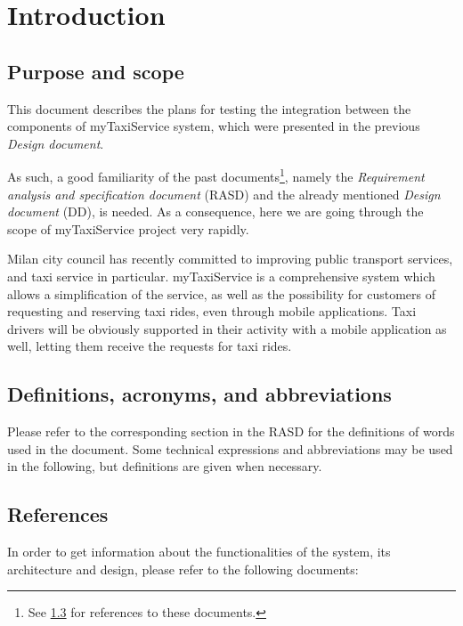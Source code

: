 \chapter{Introduction} \label{chap:introduction}



\section{Purpose and scope}
This document describes the plans for testing the integration between the components of myTaxiService system, which were presented in the previous \emph{Design document}.

As such, a good familiarity of the past documents\footnote{See \cref{sec:references} for references to these documents.}, namely the \emph{Requirement analysis and specification document} (RASD) and the already mentioned \emph{Design document} (DD), is needed. As a consequence, here we are going through the scope of myTaxiService project very rapidly.

Milan city council has recently committed to improving public transport services, and taxi service in particular. myTaxiService is a comprehensive system which allows a simplification of the service, as well as the possibility for customers of requesting and reserving taxi rides, even through mobile applications. Taxi drivers will be obviously supported in their activity with a mobile application as well, letting them receive the requests for taxi rides.



\section{Definitions, acronyms, and abbreviations}
Please refer to the corresponding section in the RASD for the definitions of words used in the document. Some technical expressions and abbreviations may be used in the following, but definitions are given when necessary. 



\section{References}\label{sec:references}
In order to get information about the functionalities of the system, its architecture and design, please refer to the following documents:

